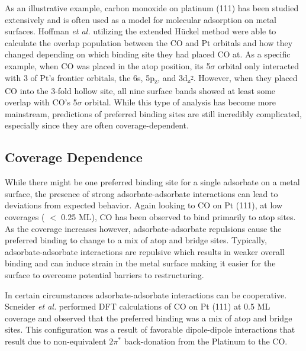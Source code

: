 As an illustrative example, carbon monoxide on platinum (111) has been studied
extensively\citep{Ertl:1977, Kelemen:1979, Yeo:1997, Wong:1991ta, Feibelman:2001, Deshlahra:2009wu,
Deshlahra:2012aa} and is often used as a model for molecular adsorption on
metal surfaces.  Hoffman {\em et al.} utilizing the extended H\"uckel
method\citep{Wong:1991ta} were able to calculate the overlap population between
the CO and Pt orbitals and how they changed depending on which binding site
they had placed CO at. As a specific example, when CO was placed in the atop
position, its 5$\sigma$ orbital only interacted with 3 of Pt's frontier
orbitals, the 6s, 5p\textsubscript{z}, and
3d\textsubscript{z\textsuperscript{2}}. However, when they placed CO into the
3-fold hollow site, all nine surface bands showed at least some overlap with
CO's 5$\sigma$ orbital. While this type of analysis has become more mainstream,
predictions of preferred binding sites are still incredibly complicated,
especially since they are often coverage-dependent.

\subsection{Coverage Dependence}
While there might be one preferred binding site for a single adsorbate on a
metal surface, the presence of strong adsorbate-adsorbate interactions can lead
to deviations from expected behavior. Again looking to CO on Pt (111), at low
coverages ( $<$ 0.25 ML), CO has been observed to bind primarily to atop sites.
As the coverage increases however, adsorbate-adsorbate repulsions cause the
preferred binding to change to a mix of atop and bridge sites. Typically,
adsorbate-adsorbate interactions are repulsive which results in weaker overall
binding and can induce strain in the metal surface making it easier for the
surface to overcome potential barriers to restructuring.

In certain circumstances adsorbate-adsorbate interactions can be cooperative.
Scneider {\em et al.} performed DFT calculations of CO on Pt (111) at 0.5 ML
coverage and observed that the preferred binding was a mix of atop and bridge
sites.\citep{Deshlahra:2012aa} This configuration was a result of favorable
dipole-dipole interactions that result due to non-equivalent $2\pi^*$
back-donation from the Platinum to the CO.


